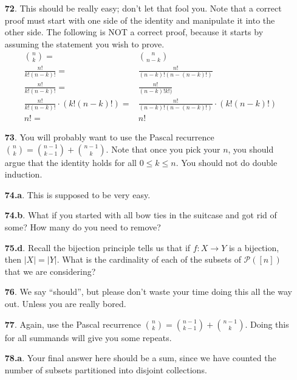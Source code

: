 \documentclass[10pt,]{book}
\theoremstyle{plain}
\theoremstyle{definition}
\theoremstyle{definition}
\theoremstyle{definition}
\numberwithin{equation}{chapter}
\def\pow{\mathcal P}
\newcommand{\card}[1]{\left| #1 \right|}
\newcommand{\amp}{&}
\begin{document}
\begin{itemize}[itemsep=1em]
\item[\textbf{72}.]\hypertarget{p-553}{}%
This should be really easy; don't let that fool you.  Note that a correct proof must start with one side of the identity and manipulate it into the other side.  The following is NOT a correct proof, because it starts by assuming the statement you wish to prove.%
\begin{align*}
\binom{n}{k}  = \amp \binom{n}{n-k}\\
\frac{n!}{k!(n-k)!} =  \amp \frac{n!}{(n-k)!(n-(n-k)!)}\\
\frac{n!}{k!(n-k)!} =  \amp \frac{n!}{(n-k)!k!)}\\
\frac{n!}{k!(n-k)!} \cdot (k!(n-k)!)=  \amp \frac{n!}{(n-k)!(n-(n-k)!)}\cdot(k!(n-k)!)\\
n! =  \amp n!
\end{align*}
%

\item[\textbf{73}.]\hypertarget{p-556}{}%
You will probably want to use the Pascal recurrence \(\binom{n}{k} = \binom{n-1}{k-1} + \binom{n-1}{k}\).  Note that once you pick your \(n\), you should argue that the identity holds for all \(0 \le k \le n\).  You should not do double induction.%

\item[\textbf{74.a}.]\hypertarget{p-559}{}%
This is supposed to be very easy.%

\item[\textbf{74.b}.]\hypertarget{p-561}{}%
What if you started with all bow ties in the suitcase and got rid of some?  How many do you need to remove?%

\item[\textbf{75.d}.]\hypertarget{p-569}{}%
Recall the bijection principle tells us that if \(f:X \to Y\) is a bijection, then \(\card{X} = \card{Y}\).  What is the cardinality of each of the subsets of \(\pow([n])\) that we are considering?%

\item[\textbf{76}.]\hypertarget{p-575}{}%
We say ``should'', but please don't waste your time doing this all the way out.  Unless you are really bored.%

\item[\textbf{77}.]\hypertarget{p-577}{}%
Again, use the Pascal recurrence \(\binom{n}{k} = \binom{n-1}{k-1} + \binom{n-1}{k}\).  Doing this for all summands will give you some repeats.%

\item[\textbf{78.a}.]\hypertarget{p-581}{}%
Your final answer here should be a sum, since we have counted the number of subsets partitioned into disjoint collections.%


\end{itemize}
\end{document}
